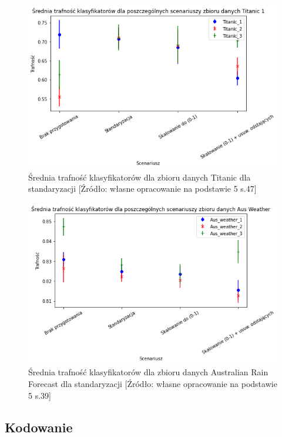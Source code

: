 \documentclass[oneside]{book}
\begin{document}
\begin{figure}[H]
    \centerline{\includegraphics[scale=0.8]{Titanic_Avg_Standaryzacja}}
    \centering
    \caption{Średnia trafność klasyfikatorów dla zbioru danych Titanic 
    dla standaryzacji
    [Źródło: własne opracowanie na podstawie 5 s.47]}
    \end{figure}

\begin{figure}[H]
    \centerline{\includegraphics[scale=0.8]{Aus_Weather_Avg_Standaryzacja}}
    \centering
    \caption{Średnia trafność klasyfikatorów dla zbioru danych Australian Rain Forecast 
    dla standaryzacji
    [Źródło: własne opracowanie na podstawie 5 s.39]}
    \end{figure}



\subsection{Kodowanie}
\end{document}
